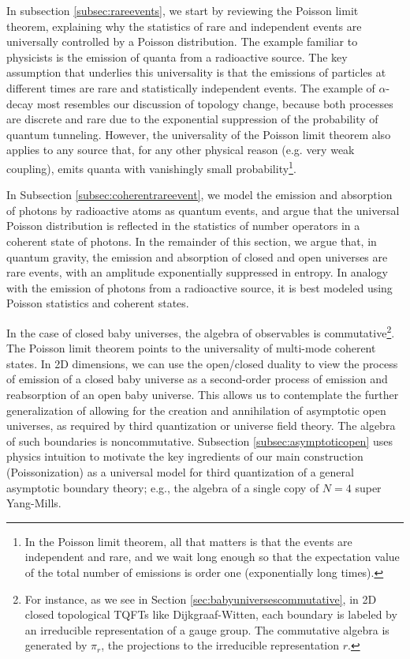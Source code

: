 \documentclass[a4paper,11pt]{article}
\theoremstyle{definition}
\numberwithin{equation}{section}
\begin{document}
In subsection \ref{subsec:rareevents}, we start by reviewing the Poisson limit theorem, explaining why the statistics of rare and independent events are universally controlled by a Poisson distribution. The example familiar to physicists is the emission of quanta from a radioactive source. The key assumption that underlies this universality is that the emissions of particles at different times are rare and statistically independent events. The example of $\alpha$-decay most resembles our discussion of topology change, because both processes are discrete and rare due to the exponential suppression of the probability of quantum tunneling. However, the universality of the Poisson limit theorem also applies to any source that, for any other physical reason (e.g. very weak coupling), emits quanta with vanishingly small probability\footnote{In the Poisson limit theorem, all that matters is that the events are independent and rare, and we wait long enough so that the expectation value of the total number of emissions is order one (exponentially long times).}.

In Subsection \ref{subsec:coherentrareevent}, we model the emission and absorption of photons by radioactive atoms as quantum events, and argue that the universal Poisson distribution is reflected in the statistics of number operators in a coherent state of photons. In the remainder of this section, we argue that, in quantum gravity, the emission and absorption of closed and open universes are rare events, with an amplitude exponentially suppressed in entropy. In analogy with the emission of photons from a radioactive source, it is best modeled using Poisson statistics and coherent states. 

In the case of closed baby universes, the algebra of observables is commutative\footnote{For instance, as we see in Section \ref{sec:babyuniversescommutative}, in 2D closed topological TQFTs like Dijkgraaf-Witten, each boundary is labeled by an irreducible representation of a gauge group. The commutative algebra is generated by $\pi_r$, the projections to the irreducible representation $r$.}. The Poisson limit theorem points to the universality of multi-mode coherent states. In 2D dimensions, we can use the open/closed duality to view the process of emission of a closed baby universe as a second-order process of emission and reabsorption of an open baby universe. This allows us to contemplate the further generalization of allowing for the creation and annihilation of asymptotic open universes, as required by third quantization or universe field theory. The algebra of such boundaries is noncommutative. Subsection \ref{subsec:asymptoticopen} uses physics intuition to motivate the key ingredients of our main construction (Poissonization) as a universal model for third quantization of a general asymptotic boundary theory; e.g., the algebra of a single copy of $N=4$ super Yang-Mills.
\end{document}

